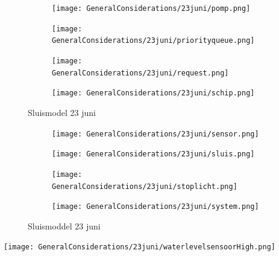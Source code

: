 \documentclass{article}
\begin{document}
	\begin{figure}
		\centering
		\begin{subfigure}{0.45\linewidth}
			\texttt{[image: GeneralConsiderations/23juni/pomp.png]}
			\caption{}
			\label{fig:1a}
		\end{subfigure}\hfill
		\begin{subfigure}{0.45\linewidth}
			\texttt{[image: GeneralConsiderations/23juni/priorityqueue.png]}
			\caption{}
			\label{fig:1a}
		\end{subfigure}
		
		\begin{subfigure}{0.45\linewidth}
			\texttt{[image: GeneralConsiderations/23juni/request.png]}
			\caption{}
			\label{fig:1a}
		\end{subfigure}\hfill
		\begin{subfigure}{0.45\linewidth}
			\texttt{[image: GeneralConsiderations/23juni/schip.png]}
			\caption{}
			\label{fig:1a}
		\end{subfigure}
		\caption{Sluismodel 23 juni}
		\label{fig:1}
	\end{figure}
	
	\begin{figure}
		\centering
		\begin{subfigure}{0.45\linewidth}
			\texttt{[image: GeneralConsiderations/23juni/sensor.png]}
			\caption{}
			\label{fig:1a}
		\end{subfigure}\hfill
		\begin{subfigure}{0.45\linewidth}
			\texttt{[image: GeneralConsiderations/23juni/sluis.png]}
			\caption{}
			\label{fig:1a}
		\end{subfigure}
		
		\begin{subfigure}{0.45\linewidth}
			\texttt{[image: GeneralConsiderations/23juni/stoplicht.png]}
			\caption{}
			\label{fig:1a}
		\end{subfigure}\hfill
		\begin{subfigure}{0.45\linewidth}
			\texttt{[image: GeneralConsiderations/23juni/system.png]}
			\caption{}
			\label{fig:1a}
		\end{subfigure}
		\caption{Sluismoddel 23 juni}
		\label{fig:1}
	\end{figure}
	
	\texttt{[image: GeneralConsiderations/23juni/waterlevelsensoorHigh.png]}
	\newpage
\end{document}
